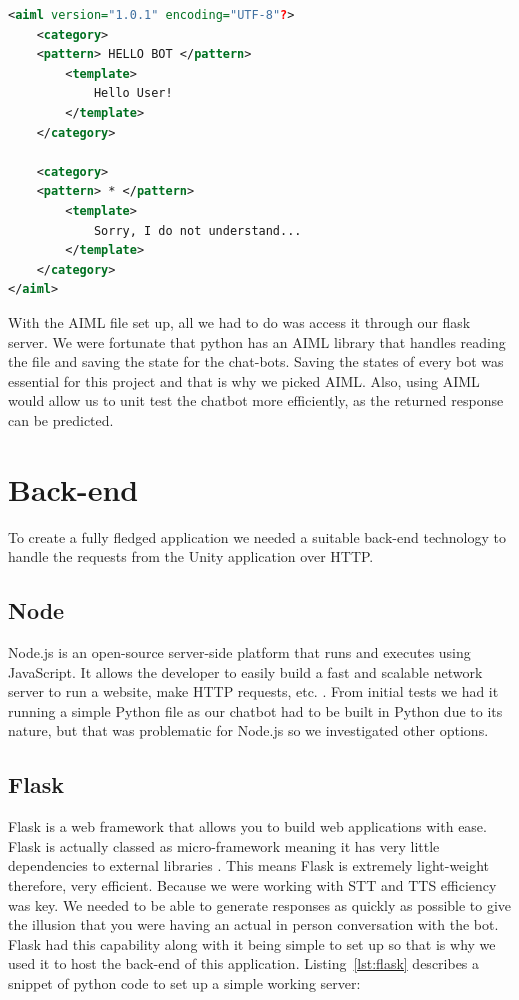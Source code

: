 \begin{lstlisting}[caption={AIML example.},label={lst:aiml}, language=XML]
<aiml version="1.0.1" encoding="UTF-8"?>
    <category>
    <pattern> HELLO BOT </pattern>
        <template>
            Hello User!
        </template>
    </category>
    
    <category>
    <pattern> * </pattern>
        <template>
            Sorry, I do not understand...
        </template>
    </category>
</aiml>

\end{lstlisting}

\newpage
With the AIML file set up, all we had to do was access it through our flask server. We were fortunate that python has an AIML library that handles reading the file and saving the state for the chat-bots. Saving the states of every bot was essential for this project and that is why we picked AIML. Also, using AIML would allow us to unit test the chatbot more efficiently, as the returned response can be predicted.

\section{Back-end}
To create a fully fledged application we needed a suitable back-end technology to handle the requests from the Unity application over HTTP.

\subsection{Node}
Node.js is an open-source server-side platform that runs and executes using JavaScript. It allows the developer to easily build a fast and scalable network server to run a website, make HTTP requests, etc. \cite{node}. From initial tests we had it running a simple Python file as our chatbot had to be built in Python due to its nature, but that was problematic for Node.js so we investigated other options.

\subsection{Flask}
Flask is a web framework that allows you to build web applications with ease. Flask is actually classed as micro-framework meaning it has very little dependencies to external libraries \cite{flask}. This means Flask is extremely light-weight therefore, very efficient. Because we were working with STT and TTS efficiency was key. We needed to be able to generate responses as quickly as possible to give the illusion that you were having an actual in person conversation with the bot. Flask had this capability along with it being simple to set up so that is why we used it to host the back-end of this application. Listing~\ref{lst:flask} describes a snippet of python code to set up a simple working server:

